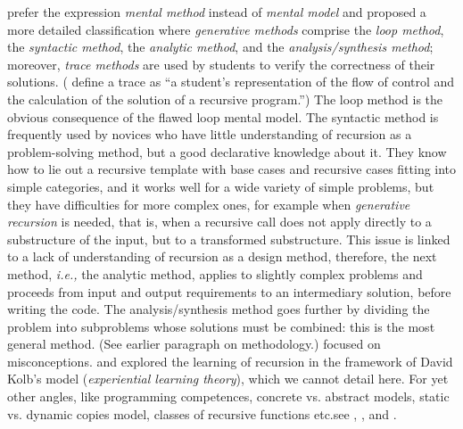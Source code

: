 \documentclass[11pt,a4paper]{article}
\begin{document}
\textcite{BhuiyanGreerGordon:1989}
\citeyearpar{BhuiyanGreerMcCalla:1991} prefer the expression
\emph{mental method} instead of \emph{mental model} and proposed a
more detailed classification where \emph{generative methods} comprise
the \emph{loop method}, the \emph{syntactic method}, the
\emph{analytic method}, and the \emph{analysis/synthesis method};
moreover, \emph{trace methods}
\citep{Bhuiyan:1992,ScholtzSanders:2010} are used by students to
verify the correctness of their solutions.
(\textcite{GotschiSandersGalpin:2003} define a trace as ``a student's
representation of the flow of control and the calculation of the
solution of a recursive program.'') The loop method is the obvious
consequence of the flawed loop mental model. The syntactic method is
frequently used by novices who have little understanding of recursion
as a problem\hyp{}solving method, but a good declarative knowledge
about it. They know how to lie out a recursive template with base
cases and recursive cases fitting into simple categories, and it works
well for a wide variety of simple problems, but they have difficulties
for more complex ones, for example when \emph{generative recursion}
\citep{FelleisenFindlerFlattKrishnamurthi:2004} is needed, that is,
when a recursive call does not apply directly to a substructure of the
input, but to a transformed substructure. This issue is linked to a
lack of understanding of recursion as a design method, therefore, the
next method, \emph{i.e.,} the analytic method, applies to slightly
complex problems and proceeds from input and output requirements to an
intermediary solution, before writing the code. The analysis/synthesis
method goes further by dividing the problem into subproblems whose
solutions must be combined: this is the most general method. (See
earlier paragraph on methodology.) \textcite{dichevaClose:1996}
\citeyearpar{CloseDicheva:1997} focused on
misconceptions. \textcite{Wu:1993} and \textcite{WuDaleBethel:1998}
explored the learning of recursion in the framework of David Kolb's
model (\emph{experiential learning theory}), which we cannot detail
here. For yet other angles, like programming competences, concrete
vs. abstract models, static vs. dynamic copies model, classes of
recursive functions etc.\@ see \textcite{Er:1995},
\textcite{Burton:1995}, \textcite{Chen:1998} and
\textcite{Mirolo:2010}.
\end{document}

